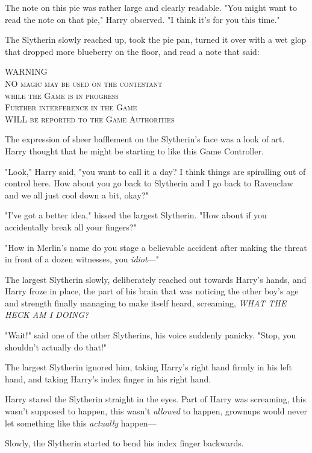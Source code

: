 The note on this pie was rather large and clearly readable. "You might want to 
read the note on that pie," Harry observed. "I think it's for you this time."

The Slytherin slowly reached up, took the pie pan, turned it over with a wet 
glop that dropped more blueberry on the floor, and read a note that said:

\begin{center}
\scshape \MakeUppercase{Warning}\\
\MakeUppercase{No} magic may be used on the contestant\\
while the Game is in progress\\
Further interference in the Game\\
\MakeUppercase{will} be reported to the Game Authorities
\end{center}

The expression of sheer bafflement on the Slytherin's face was a look of art. 
Harry thought that he might be starting to like this Game Controller.

"Look," Harry said, "you want to call it a day? I think things are spiralling 
out of control here. How about you go back to Slytherin and I go back to 
Ravenclaw and we all just cool down a bit, okay?"

"I've got a better idea," hissed the largest Slytherin. "How about if you 
accidentally break all your fingers?"

"How in Merlin's name do you stage a believable accident after making the 
threat in front of a dozen witnesses, you \emph{idiot}---"

The largest Slytherin slowly, deliberately reached out towards Harry's hands, 
and Harry froze in place, the part of his brain that was noticing the other 
boy's age and strength finally managing to make itself heard, screaming, 
\emph{WHAT THE HECK AM I DOING?}

"Wait!" said one of the other Slytherins, his voice suddenly panicky. "Stop, 
you shouldn't actually do that!"

The largest Slytherin ignored him, taking Harry's right hand firmly in his left 
hand, and taking Harry's index finger in his right hand.

Harry stared the Slytherin straight in the eyes. Part of Harry was screaming, 
this wasn't supposed to happen, this wasn't \emph{allowed} to happen, grownups 
would never let something like this \emph{actually} happen---

Slowly, the Slytherin started to bend his index finger backwards.

